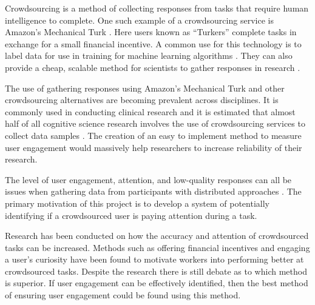 \documentclass{article}
\begin{document}
Crowdsourcing is a method of collecting responses from tasks that require human intelligence to complete. 
One such example of a crowdsourcing service is Amazon's Mechanical Turk \cite{AmazonTurk}.
Here users known as ``Turkers'' complete tasks in exchange for a small financial incentive. 
A common use for this technology is to label data for use in training for machine learning algorithms \cite{chang2017revolt}.
They can also provide a cheap, scalable method for scientists to gather responses in research \cite{paolacci2010running}.

The use of gathering responses using Amazon's Mechanical Turk and other crowdsourcing alternatives are becoming prevalent across disciplines.
It is commonly used in conducting clinical research \cite{chandler2016conducting} and it is estimated that almost half of all cognitive science research involves the use of crowdsourcing services to collect data samples \cite{stewart2017crowdsourcing}.
The creation of an easy to implement method to measure user engagement would massively help researchers to increase reliability of their research.

The level of user engagement, attention, and low-quality responses can all be issues when gathering data from participants with distributed approaches \cite{ipeirotis2010quality}.
The primary motivation of this project is to develop a system of potentially identifying if a crowdsourced user is paying attention during a task.


Research has been conducted on how the accuracy and attention of crowdsourced tasks can be increased.
Methods such as offering financial incentives \cite{ho2015incentivizing} and engaging a user's curiosity \cite{law2016curiosity} have been found to motivate workers into performing better at crowdsourced tasks.
Despite the research there is still debate as to which method is superior.
If user engagement can be effectively identified, then the best method of ensuring user engagement could be found using this method.

\end{document}
